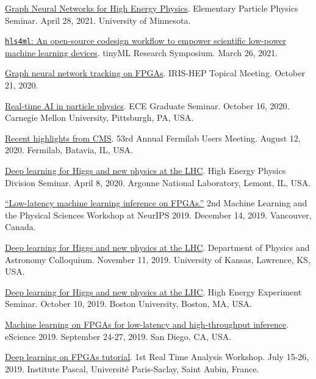 \documentclass{res}
\begin{document}
\begin{resume}
  \href{https://cse.umn.edu/physics/elementary-particle-physics-elem-part-phys-seminar}{Graph Neural Networks for High Energy Physics}. Elementary Particle Physics Seminar. April 28, 2021. University of Minnesota.

  \href{https://www.tinyml.org/event/research-symposium-2021/}{\texttt{hls4ml}: An open-source codesign workflow to empower scientific low-power machine learning devices}. tinyML Research Symposium. March 26, 2021.

  \href{https://indico.cern.ch/event/955026/}{Graph neural network tracking on FPGAs}. IRIS-HEP Topical Meeting. October 21, 2020.

  \href{https://www.cs.cmu.edu/calendar/fri-2020-10-16-1200/ece-graduate-seminar}{Real-time AI in particle physics}. ECE Graduate Seminar. October 16, 2020. Carnegie Mellon University, Pittsburgh, PA, USA.

  \href{https://indico.fnal.gov/event/23109/contributions/193292/}{Recent highlights from CMS}. 53rd Annual Fermilab Users Meeting. August 12, 2020. Fermilab, Batavia, IL, USA.

  \href{https://indico.fnal.gov/event/22961/}{Deep learning for Higgs and new physics at the LHC}. High Energy Physics Division Seminar. April 8, 2020. Argonne National Laboratory, Lemont, IL, USA.

  \href{https://ml4physicalsciences.github.io/2019/files/NeurIPS_ML4PS_2019_74.pdf}{``Low-latency machine learning inference on FPGAs.''} 2nd Machine Learning and the Physical Sciences Workshop at NeurIPS 2019.  December 14, 2019. Vancouver, Canada.

  \href{https://physics.drupal.ku.edu/calendar/colloquia#/?i=2}{Deep learning for Higgs and new physics at the LHC}. Department of Physics and Astronomy Colloquium. November 11, 2019. University of Kansas, Lawrence, KS, USA.

  \href{http://physics.bu.edu/events/show/2204}{Deep learning for Higgs and new physics at the LHC}. High Energy Experiment Seminar. October 10, 2019. Boston University, Boston, MA, USA.

  \href{https://escience2019.sdsc.edu/program}{Machine learning on FPGAs for low-latency and high-throughput inference}. eScience 2019. September 24-27, 2019. San Diego, CA, USA.

  \href{https://indico.cern.ch/event/793125/contributions/3495251/}{Deep learning on FPGAs tutorial}. 1st Real Time Analysis Workshop. July 15-26, 2019. Institute Pascal, Universit\'{e} Paris-Saclay, Saint Aubin, France.


\end{resume}
\end{document}
